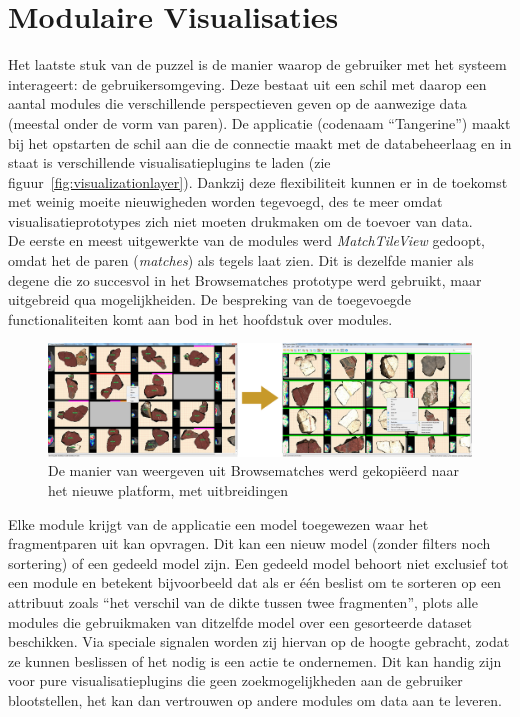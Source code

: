 \section{Modulaire Visualisaties}
Het laatste stuk van de puzzel is de manier waarop de gebruiker met het systeem interageert: de gebruikersomgeving. Deze bestaat uit een schil met daarop een aantal modules die verschillende perspectieven geven op de aanwezige data (meestal onder de vorm van paren). De applicatie (codenaam ``Tangerine'') maakt bij het opstarten de schil aan die de connectie maakt met de databeheerlaag en in staat is verschillende visualisatieplugins te laden (zie figuur~\ref{fig:visualizationlayer}). Dankzij deze flexibiliteit kunnen er in de toekomst met weinig moeite nieuwigheden worden tegevoegd, des te meer omdat visualisatieprototypes zich niet moeten drukmaken om de toevoer van data.\\

De eerste en meest uitgewerkte van de modules werd \emph{MatchTileView} gedoopt, omdat het de paren (\emph{matches}) als tegels laat zien. Dit is dezelfde manier als degene die zo succesvol in het Browsematches prototype werd gebruikt, maar uitgebreid qua mogelijkheiden. De bespreking van de toegevoegde functionaliteiten komt aan bod in het hoofdstuk over modules.\\

\begin{figure}[ht]
	\begin{center}
		\includegraphics[width=1.0\columnwidth]{images/browsematches-to-tangerine-01.png}
		\caption{De manier van weergeven uit Browsematches werd gekopi\"eerd naar het nieuwe platform, met uitbreidingen}
		\label{fig:browsematchestotang}
	\end{center}
\end{figure}

Elke module krijgt van de applicatie een model toegewezen waar het fragmentparen uit kan opvragen. Dit kan een nieuw model (zonder filters noch sortering) of een gedeeld model zijn. Een gedeeld model behoort niet exclusief tot een module en betekent bijvoorbeeld dat als er \'e\'en beslist om te sorteren op een attribuut zoals ``het verschil van de dikte tussen twee fragmenten'', plots alle modules die gebruikmaken van ditzelfde model over een gesorteerde dataset beschikken. Via speciale signalen worden zij hiervan op de hoogte gebracht, zodat ze kunnen beslissen of het nodig is een actie te ondernemen. Dit kan handig zijn voor pure visualisatieplugins die geen zoekmogelijkheden aan de gebruiker blootstellen, het kan dan vertrouwen op andere modules om data aan te leveren.\\

